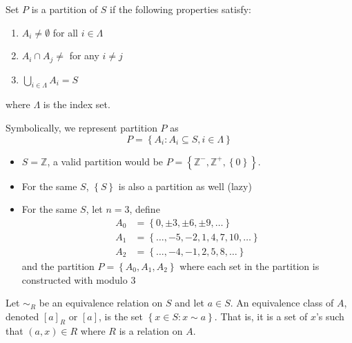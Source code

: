 \begin{definition}[Partition]
    Set \(P\) is a partition of \(S\) if the following properties satisfy:
    \begin{enumerate}
        \item \(A_i \neq \emptyset\) for all \(i \in \Lambda\)
        \item \(A_i \cap A_j \neq\) for any \(i \neq j\)
        \item \(\bigcup_{i \in \Lambda} A_i = S\)
    \end{enumerate}
    where \(\Lambda\) is the index set.

    Symbolically, we represent partition \(P\) as 
    \[
        P = \left\{A_i : A_i \subseteq S, i \in \Lambda\right\}
    \]
\end{definition}

\begin{nexample}
    \phantom{wow}

    \begin{itemize}
        \item \(S = \mathbb{Z}\), a valid partition would be \(P = \left\{\mathbb{Z}^-, \mathbb{Z}^+, \left\{0\right\}\right\}\).
        \item For the same \(S\), \(\left\{S\right\}\) is also a partition as well (lazy)
        \item For the same \(S\), let \(n = 3\), define
            \[
            \begin{aligned}
                A_0 &= \left\{0, \pm 3, \pm 6, \pm 9, \ldots\right\} \\
                A_1 &= \left\{\ldots, -5, -2, 1, 4, 7, 10, \ldots\right\} \\
                A_2 &= \left\{\ldots, -4, -1, 2, 5, 8, \ldots\right\}
            \end{aligned}
            \]
            and the partition \(P = \left\{A_0, A_1, A_2\right\}\) where each set in the partition is constructed with modulo 3
    \end{itemize}
\end{nexample}

\begin{definition}
    Let \(\sim_{R}\) be an equivalence relation on \(S\) and let \(a \in S\). An equivalence class of \(A\), denoted \([a]_R\) or \([a]\), is the set \(\left\{x \in S : x \sim a\right\}\). That is, it is a set of \(x\)'s such that \((a, x) \in R\) where \(R\) is a relation on \(A\).
\end{definition}


